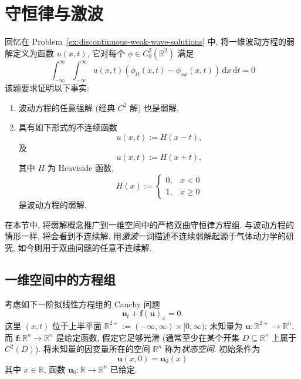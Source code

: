 \section{守恒律与激波}\label{chap:conservation-laws-shocks}\label{chap:local-existence}

回忆在 Problem~\ref{ex:discontinuous-weak-wave-solutions} 中, 将一维波动方程的弱解定义为函数 $u(x,t)$, 它对每个 $\phi\in C_0^2(\mathbb{R}^2)$ 满足
\begin{equation}\label{eq:conservation-intro-weak-wave}
\int_{-\infty}^{\infty}\int_{-\infty}^{\infty}u(x,t)(\phi_{tt}(x,t)-\phi_{xx}(x,t))\,\mathrm{d}x\,\mathrm{d}t=0
\end{equation}
该题要求证明以下事实:
\begin{enumerate}
\item 波动方程的任意强解 (经典 $C^2$ 解) 也是弱解,
\item 具有如下形式的不连续函数
\begin{equation}\label{eq:conservation-intro-right-step}
u(x,t):=H(x-t),
\end{equation}
及
\begin{equation}\label{eq:conservation-intro-left-step}
u(x,t):=H(x+t),
\end{equation}
其中 $H$ 为 Heaviside 函数,
\begin{equation}\label{eq:conservation-intro-heaviside}
H(x):=\begin{cases}0,&x<0\\1,&x\geq0\end{cases}
\end{equation}
是波动方程的弱解.\end{enumerate}

在本节中, 将弱解概念推广到一维空间中的严格双曲守恒律方程组. 与波动方程的情形一样, 将会看到不连续解. 用\emph{激波}一词描述不连续弱解起源于气体动力学的研究, 如今则用于双曲问题的任意不连续解.

\subsection{一维空间中的方程组}\label{sec:one-dimensional-conservation-systems}

考虑如下一阶拟线性方程组的 Cauchy 问题
\begin{equation}\label{eq:conservation-law-system}
\bm{u}_t+\bm{f}(\bm{u})_x=0.
\end{equation}
这里 $(x,t)$ 位于上半平面 $\mathbb{R}^{2+}:=(-\infty,\infty)\times[0,\infty)$; 未知量为 $\bm{u}:\mathbb{R}^{2+}\to\mathbb{R}^n$, 而 $\bm{f}:\mathbb{R}^n\to\mathbb{R}^n$ 是给定函数, 假定它足够光滑 (通常至少在某个开集 $D\subseteq\mathbb{R}^n$ 上属于 $C^2(D)$). 将未知量的因变量所在的空间 $\mathbb{R}^n$ 称为\emph{状态空间}. 初始条件为
\begin{equation}\label{eq:conservation-law-cauchy-data}
\bm{u}(x,0)=\bm{u}_0(x)
\end{equation}
其中 $x\in\mathbb{R}$, 函数 $\bm{u}_0:\mathbb{R}\to\mathbb{R}^n$ 已给定.

